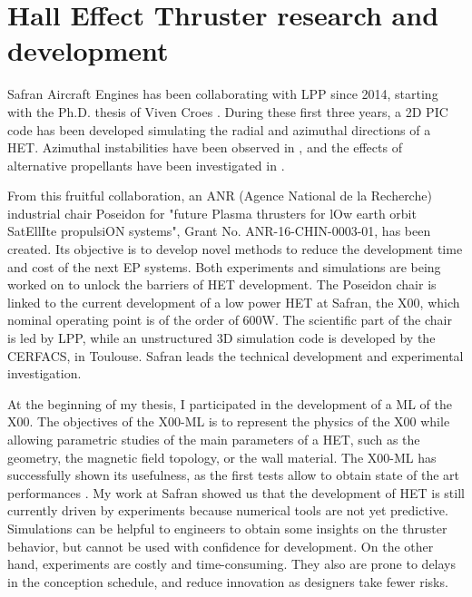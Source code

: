 

\section{Hall Effect Thruster research and development}
\label{sec-poseidon}

Safran Aircraft Engines has been collaborating with \ac{LPP} since 2014, starting with the Ph.D. thesis of Viven Croes \citep{croes2017}.
During these first three years, a \ac{2D} \ac{PIC} code has been developed simulating the radial and azimuthal directions of a \ac{HET}.
Azimuthal instabilities have been observed in \citet{croes2017a}, and the effects of alternative propellants have been investigated in \citet{croes2018}.

From this fruitful collaboration, an ANR (Agence National de la Recherche) industrial chair {\sc Poseidon} for  "future Plasma thrusters for lOw earth orbit SatEllIte propulsiON systems", Grant No. ANR-16-CHIN-0003-01, has been created.
Its objective is to develop novel methods to reduce the development time and cost of the next \ac{EP} systems.
Both experiments and simulations are being worked on  to unlock the barriers of \ac{HET} development.
The {\sc Poseidon} chair is linked to the current development of a  low power \ac{HET} at Safran, the \PPS X00, which nominal operating point is of the order of 600W.
The scientific part of the chair is led by \ac{LPP}, while an unstructured \acs{3D} simulation code is developed by the CERFACS, in Toulouse.
Safran leads the technical development and experimental investigation.

At the beginning of my thesis, I participated in the development of a \ac{ML} of the \PPS X00.
The objectives of the \PPS X00-\ac{ML}  is to represent the physics of the \PPS X00 while allowing parametric studies of the main parameters of a \ac{HET}, such as the geometry, the magnetic field topology, or the wall material.
The \PPS X00-\ac{ML} has successfully shown its usefulness, as the first tests allow to obtain state of the art performances \citep{vaudolon2018}.
My work at Safran showed us that the development of \ac{HET} is still currently driven by experiments because numerical tools are not yet predictive.
Simulations can be helpful to engineers to obtain some insights on the thruster behavior, but cannot be used with confidence for development.
On the other hand, experiments are costly and time-consuming.
They also are prone to delays in the conception schedule, and reduce innovation as designers take fewer risks.

